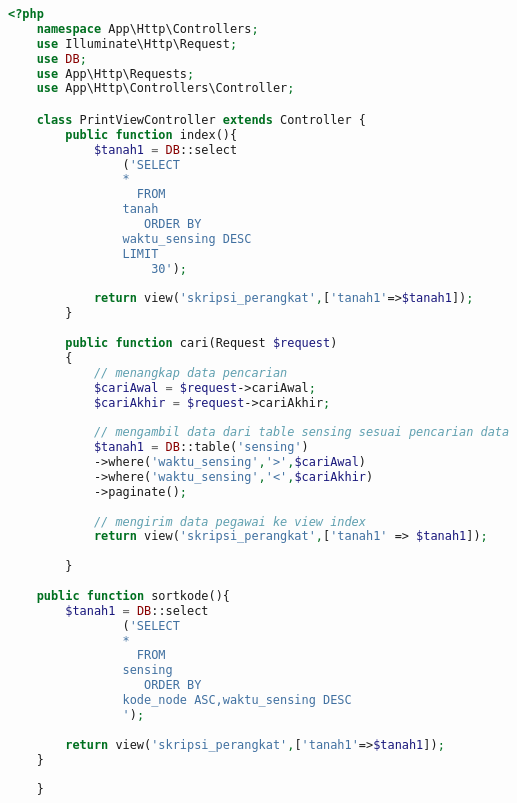 \begin{lstlisting}[language=PHP, caption=PrintViewController.php]
<?php
    namespace App\Http\Controllers;
    use Illuminate\Http\Request;
    use DB;
    use App\Http\Requests;
    use App\Http\Controllers\Controller;

    class PrintViewController extends Controller {
        public function index(){
			$tanah1 = DB::select
			    ('SELECT
				*
			      FROM
				tanah
			       ORDER BY
				waktu_sensing DESC
				LIMIT
				    30');
            
            return view('skripsi_perangkat',['tanah1'=>$tanah1]); 
        }
        
        public function cari(Request $request)
		{
			// menangkap data pencarian
			$cariAwal = $request->cariAwal;
			$cariAkhir = $request->cariAkhir;
	 
			// mengambil data dari table sensing sesuai pencarian data
			$tanah1 = DB::table('sensing')
			->where('waktu_sensing','>',$cariAwal)
			->where('waktu_sensing','<',$cariAkhir)
			->paginate();
	 
			// mengirim data pegawai ke view index
			return view('skripsi_perangkat',['tanah1' => $tanah1]);
	 
		}
		
	public function sortkode(){
	    $tanah1 = DB::select
			    ('SELECT
				*
			      FROM
				sensing
			       ORDER BY
				kode_node ASC,waktu_sensing DESC
			    ');
				    
	    return view('skripsi_perangkat',['tanah1'=>$tanah1]);
	}
	    
    }
\end{lstlisting}

